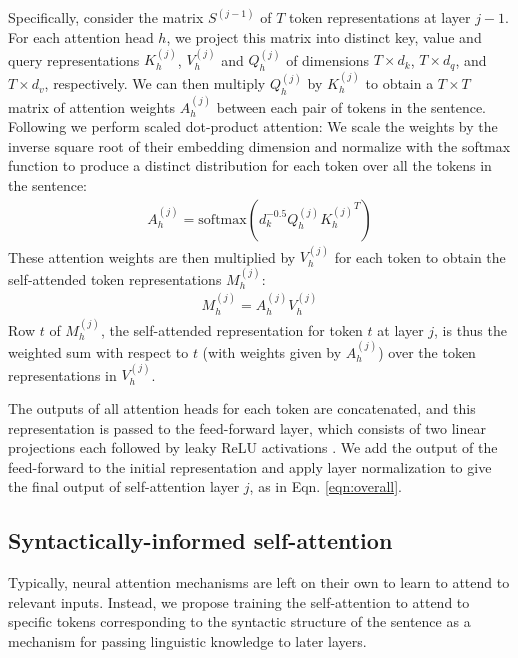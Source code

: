 \documentclass[11pt,a4paper]{article}
\begin{document}
Specifically, consider the matrix $S^{(j-1)}$ of $T$ token representations at layer $j-1$. For each attention head $h$, we project this matrix into distinct key, value and query representations $K_h^{(j)}$, $V_h^{(j)}$ and $Q_h^{(j)}$ of dimensions $T\times d_k$, $T\times d_q$, and $T\times d_v$, respectively. We can then multiply $Q_h^{(j)}$ by $K_h^{(j)}$ to obtain a $T\times T$ matrix of attention weights $A_h^{(j)}$ between each pair of tokens in the sentence. Following \citet{vaswani2017attention} we perform scaled dot-product attention: We scale the weights by the inverse square root of their embedding dimension and normalize with the softmax function to produce a distinct distribution for each token over all the tokens in the sentence:
\begin{align}
A_h^{(j)} = \mathrm{softmax}(d_{k}^{-0.5}Q_h^{(j)}{K_h^{(j)}}^T)
\end{align}
These attention weights are then multiplied by $V_h^{(j)}$ for each token to obtain the self-attended token representations $M_h^{(j)}$:
\begin{align}
M_h^{(j)} = A_h^{(j)}V_h^{(j)}
\end{align}
Row $t$ of $M_h^{(j)}$, the self-attended representation for token $t$ at layer $j$, is thus the weighted sum with respect to $t$ (with weights given by $A_h^{(j)}$) over the token representations in $V_h^{(j)}$. 

The outputs of all attention heads for each token are concatenated, and this representation is passed to the feed-forward layer, which consists of two linear projections each followed by leaky ReLU activations \citep{maas2012rectifier}. We add the output of the feed-forward to the initial representation and apply layer normalization to give the final output of self-attention layer $j$, as in Eqn. \ref{eqn:overall}.

\subsection{Syntactically-informed self-attention \label{sec:syntax-attn}}
Typically, neural attention mechanisms are left on their own to learn to attend to relevant inputs. Instead, we propose training the self-attention to attend to specific tokens corresponding to the syntactic structure of the sentence as a mechanism for passing linguistic knowledge to later layers. 
\end{document}
